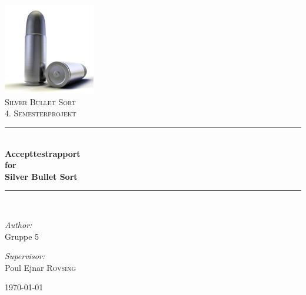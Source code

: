 \documentclass[Main.tex]{subfiles}
\newcommand{\HRule}{\rule{\linewidth}{0.8mm}}
\begin{document}
\begin{titlepage}

\begin{center}


\includegraphics[width=0.30\textwidth]{./0_1_ForsideBillede.jpg}\\[1cm]    

\textsc{\LARGE Silver Bullet Sort}\\[1.5cm]

\textsc{\Large 4. Semesterprojekt}\\[0.5cm]


\HRule \\[0.4cm]

{ \huge \bfseries Accepttestrapport}\\[0.4cm]
{ \huge \bfseries for}\\[0.4cm] 
{ \huge \bfseries Silver Bullet Sort}\\[0.4cm]

\HRule \\[1.5cm]

\begin{minipage}{0.4\textwidth}
\begin{flushleft} \large
\emph{Author:}\\
Gruppe \textsc{5}
\end{flushleft}
\end{minipage}
\begin{minipage}{0.4\textwidth}
\begin{flushright} \large
\emph{Supervisor:} \\
Poul Ejnar \textsc{Rovsing}
\end{flushright}
\end{minipage}

\vfill

{\large \today}

\end{center}

\end{titlepage}
\end{document}
